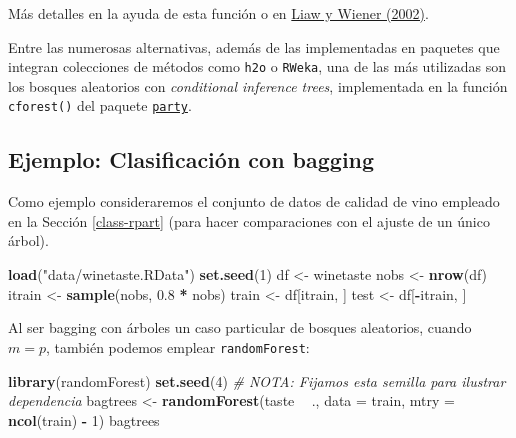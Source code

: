 \documentclass[
  spanish,
]{book}
\newenvironment{Shaded}{\begin{snugshade}}{\end{snugshade}}
\newcommand{\CommentTok}[1]{\textcolor[rgb]{0.56,0.35,0.01}{\textit{#1}}}
\newcommand{\DataTypeTok}[1]{\textcolor[rgb]{0.13,0.29,0.53}{#1}}
\newcommand{\DecValTok}[1]{\textcolor[rgb]{0.00,0.00,0.81}{#1}}
\newcommand{\FloatTok}[1]{\textcolor[rgb]{0.00,0.00,0.81}{#1}}
\newcommand{\KeywordTok}[1]{\textcolor[rgb]{0.13,0.29,0.53}{\textbf{#1}}}
\newcommand{\NormalTok}[1]{#1}
\newcommand{\OperatorTok}[1]{\textcolor[rgb]{0.81,0.36,0.00}{\textbf{#1}}}
\newcommand{\StringTok}[1]{\textcolor[rgb]{0.31,0.60,0.02}{#1}}
\theoremstyle{break}
\theoremstyle{definition}
\theoremstyle{definition}
\theoremstyle{definition}
\theoremstyle{remark}
\begin{document}
Más detalles en la ayuda de esta función o en \href{https://www.r-project.org/doc/Rnews/Rnews_2002-3.pdf}{Liaw y Wiener (2002)}.

Entre las numerosas alternativas, además de las implementadas en paquetes que integran colecciones de métodos como \texttt{h2o} o \texttt{RWeka}, una de las más utilizadas son los bosques aleatorios con \emph{conditional inference trees}, implementada en la función \texttt{cforest()} del paquete \href{https://CRAN.R-project.org/package=party}{\texttt{party}}.

\hypertarget{ejemplo-clasificaciuxf3n-con-bagging}{%
\subsection{Ejemplo: Clasificación con bagging}\label{ejemplo-clasificaciuxf3n-con-bagging}}

Como ejemplo consideraremos el conjunto de datos de calidad de vino empleado en la Sección \ref{class-rpart} (para hacer comparaciones con el ajuste de un único árbol).

\begin{Shaded}
\begin{Highlighting}[]
\KeywordTok{load}\NormalTok{(}\StringTok{"data/winetaste.RData"}\NormalTok{)}
\KeywordTok{set.seed}\NormalTok{(}\DecValTok{1}\NormalTok{)}
\NormalTok{df <-}\StringTok{ }\NormalTok{winetaste}
\NormalTok{nobs <-}\StringTok{ }\KeywordTok{nrow}\NormalTok{(df)}
\NormalTok{itrain <-}\StringTok{ }\KeywordTok{sample}\NormalTok{(nobs, }\FloatTok{0.8} \OperatorTok{*}\StringTok{ }\NormalTok{nobs)}
\NormalTok{train <-}\StringTok{ }\NormalTok{df[itrain, ]}
\NormalTok{test <-}\StringTok{ }\NormalTok{df[}\OperatorTok{-}\NormalTok{itrain, ]}
\end{Highlighting}
\end{Shaded}

Al ser bagging con árboles un caso particular de bosques aleatorios, cuando \(m = p\), también podemos emplear \texttt{randomForest}:

\begin{Shaded}
\begin{Highlighting}[]
\KeywordTok{library}\NormalTok{(randomForest)}
\KeywordTok{set.seed}\NormalTok{(}\DecValTok{4}\NormalTok{) }\CommentTok{# NOTA: Fijamos esta semilla para ilustrar dependencia}
\NormalTok{bagtrees <-}\StringTok{ }\KeywordTok{randomForest}\NormalTok{(taste }\OperatorTok{~}\StringTok{ }\NormalTok{., }\DataTypeTok{data =}\NormalTok{ train, }\DataTypeTok{mtry =} \KeywordTok{ncol}\NormalTok{(train) }\OperatorTok{-}\StringTok{ }\DecValTok{1}\NormalTok{)}
\NormalTok{bagtrees}
\end{Highlighting}
\end{Shaded}
\end{document}
